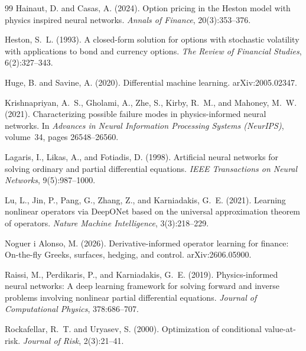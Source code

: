 \documentclass{article}
\begin{document}
\begin{thebibliography}{99}
Hainaut, D. and Casas, A. (2024).
\newblock Option pricing in the Heston model with physics inspired neural networks.
\newblock \emph{Annals of Finance}, 20(3):353--376.

Heston, S.~L. (1993).
\newblock A closed-form solution for options with stochastic volatility with
applications to bond and currency options.
\newblock \emph{The Review of Financial Studies}, 6(2):327--343.

Huge, B. and Savine, A. (2020).
\newblock Differential machine learning.
\newblock arXiv:2005.02347.

Krishnapriyan, A.~S., Gholami, A., Zhe, S., Kirby, R.~M., and Mahoney, M.~W. (2021).
\newblock Characterizing possible failure modes in physics-informed neural networks.
\newblock In \emph{Advances in Neural Information Processing Systems (NeurIPS)},
volume~34, pages 26548--26560.

Lagaris, I., Likas, A., and Fotiadis, D. (1998).
\newblock Artificial neural networks for solving ordinary and partial
differential equations.
\newblock \emph{IEEE Transactions on Neural Networks}, 9(5):987--1000.

Lu, L., Jin, P., Pang, G., Zhang, Z., and Karniadakis, G.~E. (2021).
\newblock Learning nonlinear operators via DeepONet based on the universal
approximation theorem of operators.
\newblock \emph{Nature Machine Intelligence}, 3(3):218--229.

Noguer i Alonso, M. (2026).
\newblock Derivative-informed operator learning for finance: On-the-fly Greeks,
surfaces, hedging, and control.
\newblock arXiv:2606.05900.

Raissi, M., Perdikaris, P., and Karniadakis, G.~E. (2019).
\newblock Physics-informed neural networks: A deep learning framework for solving
forward and inverse problems involving nonlinear partial differential equations.
\newblock \emph{Journal of Computational Physics}, 378:686--707.

Rockafellar, R.~T. and Uryasev, S. (2000).
\newblock Optimization of conditional value-at-risk.
\newblock \emph{Journal of Risk}, 2(3):21--41.


\end{thebibliography}
\end{document}
